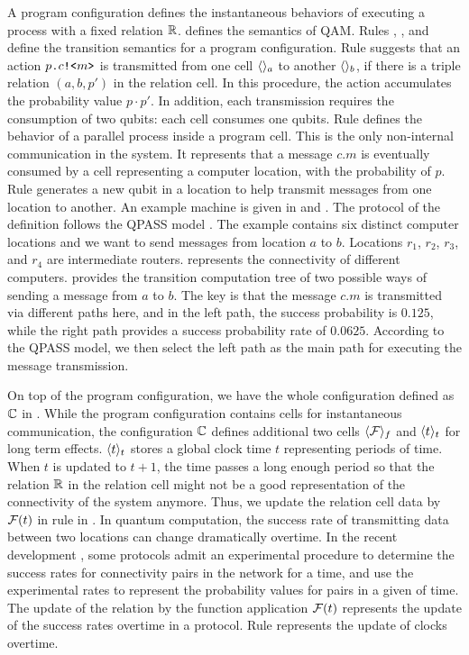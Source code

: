 A program configuration defines the instantaneous behaviors of executing a process with a fixed relation $\mathbb{R}$.
 defines the semantics of QAM.
Rules , , and  define the transition semantics for a program configuration.
Rule  suggests that an action $p\texttt{.}c\texttt{!<}m\texttt{>}$ is transmitted from one cell $\langle  \rangle_a$ to another $\langle  \rangle_b$,
if there is a triple relation $(a,b,p')$ in the relation cell. 
In this procedure, the action accumulates the probability value $p\cdot p'$.
In addition, each transmission requires the consumption of two qubits: each cell consumes one qubits.
Rule  defines the behavior of a parallel process inside a program cell.
This is the only non-internal communication in the system. It represents that a message $c.m$
is eventually consumed by a cell representing a computer location, with the probability of $p$.
Rule  generates a new qubit in a location to help transmit messages from one location to another.
An example machine is given in  and .
The protocol of the definition follows the QPASS model \cite{10.1145/3387514.3405853}. 
The example contains six distinct computer locations and we want to send messages from location $a$ to $b$.
Locations $r_1$, $r_2$, $r_3$, and $r_4$ are intermediate routers. 
 represents the connectivity of different computers. 
 provides the transition computation tree of two possible ways of sending a message from $a$ to $b$.
The key is that the message $c.m$ is transmitted via different paths here, 
and in the left path, the success probability is $0.125$, while the right path provides a success probability rate of $0.0625$.
According to the QPASS model, we then select the left path as the main path for executing the message transmission.

On top of the program configuration, we have the whole configuration defined as $\mathbb{C}$ in . 
While the program configuration contains cells for instantaneous communication,
the configuration $\mathbb{C}$ defines additional two cells $\langle \mathcal{F} \rangle_{f}$ and $\langle t \rangle_{t}$ for long term effects.
$\langle t \rangle_{t}$ stores a global clock time $t$ representing periods of time. When $t$ is updated to $t+1$, the time passes a long enough period so that the relation $\mathbb{R}$ in the relation cell might not be a good representation of the connectivity of the system anymore.
Thus, we update the relation cell data by $\mathcal{F}(t)$ in rule  in .
In quantum computation, the success rate of transmitting data between two locations can change dramatically overtime.
In the recent development \cite{https://doi.org/10.48550/arxiv.2205.06300}, 
some protocols admit an experimental procedure to determine the success rates for connectivity pairs in the network for a time, and use the experimental rates to represent the probability values for pairs in a given of time.
The update of the relation by the function application $\mathcal{F}(t)$ represents the update of the success rates overtime in a protocol.
Rule  represents the update of clocks overtime.



